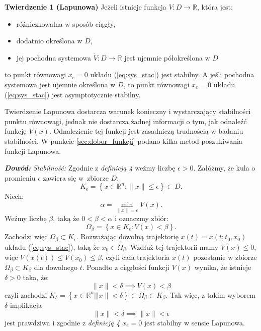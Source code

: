\documentclass{article}
\begin{document}
\textbf{Twierdzenie 1 (Lapunowa)}
Jeżeli istnieje funkcja $V: D \rightarrow \mathbb{R}$, która jest:
\begin{itemize}
    \item różniczkowalna w sposób ciągły,
    \item dodatnio określona w $D$,
    \item jej pochodna systemowa $\dot{V}:D\rightarrow \mathbb{R}$ jest ujemnie półokreślona w $D$
\end{itemize}
to punkt równowagi $x_{e} = 0$ układu (\ref{eq:sys_stac}) jest stabilny.
A jeśli pochodna systemowa jest ujemnie określona w $D$, to punkt równowagi $x_{e} = 0$ układu (\ref{eq:sys_stac}) jest asymptotycznie stabilny.

\begin{tcolorbox}[colback=blue!5, colframe=blue!75!black, title=Ważne]
Twierdzenie Lapunowa dostarcza warunek konieczny i wystarczający stabilności punktu równowagi, jednak nie dostarcza żadnej informacji o tym, jak odnaleźć funkcję $V(x)$. Odnalezienie tej funkcji jest zasadniczą trudnością w badaniu stabilności.
W punkcie \ref{sec:dobor_funkcji} podano kilka metod poszukiwania funkcji Lapunowa.
\end{tcolorbox}

\textbf{\textit{Dowód:}}
\textit{Stabilność:}
Zgodnie z \textit{definicją 4 }weźmy liczbę $\epsilon > 0$.
Załóżmy, że kula o promieniu $\epsilon$ zawiera się w~zbiorze $D$:
$$
    K_{\epsilon} = \left\{ x\in \mathbb{R}^{n}: \lVert x \rVert \leq \epsilon \right\} \subset D.
$$
Niech:
$$
    \alpha = \min_{\lVert x \rVert = \epsilon }V(x).
$$
Weźmy liczbę $\beta$, taką że $0 < \beta < \alpha$ i oznaczmy zbiór:
$$
    \Omega_{\beta} = \left\{ x \in K_{\epsilon}: V(x) < \beta \right\}.
$$
Zachodzi więc $\Omega_{\beta} \subset K_{\epsilon}$.
Rozważając dowolną trajektorię $x(t) = x(t; t_{0}, x_{0})$ układu (\ref{eq:sys_stac}), taką że $x_{0} \in \Omega_{\beta}$.
Wzdłuż tej trajektorii mamy $\dot{V}(x) \leq 0$, więc $V(x(t)) \leq V(x_{0}) \leq \beta$, czyli cała trajektoria $x(t)$ pozostanie w zbiorze $\Omega_{\beta} \subset K_{\beta}$ dla dowolnego $t$.
Ponadto z ciągłości funkcji $V(x)$ wynika, że istnieje $\delta > 0$ taka, że:
$$
    \lVert x \rVert < \delta \implies V(x) < \beta
$$
czyli zachodzi $K_{\delta} = \left\{ x \in \mathbb{R}^{n}| \Vert x \rVert < \delta \right\} \subset \Omega_{\beta} \subset K_{\beta}$. Tak więc, z takim wyborem $\delta$ implikacja
$$
    \lVert x \rVert < \delta \implies \lVert x \rVert < \epsilon
$$
jest prawdziwa i zgodnie z \textit{definicją 4} $x_{e} = 0$ jest stabilny w sensie Lapunowa.
\end{document}
